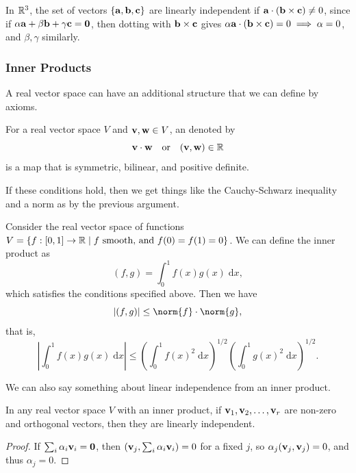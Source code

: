 \documentclass[a4paper]{scrartcl}
\begin{document}
In $\mathbb{R}^3$, the set of vectors $\{\mathbf{a}, \mathbf{b}, \mathbf{c}\}$ are linearly independent if $\mathbf{a} \cdot (\mathbf{b} \times \mathbf{c}) \neq 0$, since if $\alpha \mathbf{a} + \beta \mathbf{b} + \gamma \mathbf{c} = \mathbf{0}$, then dotting with $\mathbf{b} \times \mathbf{c}$ gives $\alpha \mathbf{a} \cdot (\mathbf{b} \times \mathbf{c}) = 0 \implies \alpha = 0$, and $\beta, \gamma$ similarly.


\subsubsection{Inner Products}

A real vector space can have an additional structure that we can define by axioms.

\begin{definition}
    For a real vector space $V$ and $\mathbf{v}, \mathbf{w} \in V$, an  denoted by
    $$
    \mathbf{v} \cdot \mathbf{w} \quad \text{or} \quad (\mathbf{v}, \mathbf{w}) \in \mathbb{R}
    $$
    is a map that is symmetric, bilinear, and positive definite.
\end{definition}

If these conditions hold, then we get things like the Cauchy-Schwarz inequality and a norm as by the previous argument.

\begin{example}
    Consider the real vector space of functions $V = \{ f: [0, 1] \rightarrow \mathbb{R} \mid f \text{ smooth, and } f(0) = f(1) = 0 \}$.
    We can define the inner product as
    $$
    (f, g) = \int_0^1 f(x)g(x) \; \mathrm{d}x,
    $$
    which satisfies the conditions specified above. Then we have
    $$
    |(f, g)| \leq \norm{f} \cdot \norm{g},
    $$
    that is,
    $$
    \left| \int_0^1 f(x)g(x)\; \mathrm{d}x \right| \leq \left(\int_0^1 f(x)^2\; \mathrm{d}x\right)^{1/2} \left(\int_0^1 g(x)^2\; \mathrm{d}x\right)^{1/2}.
    $$
\end{example}

We can also say something about linear independence from an inner product.

\begin{lemma}
In any real vector space $V$ with an inner product, if $\mathbf{v}_1, \mathbf{v}_2, \dots, \mathbf{v}_r$ are non-zero and orthogonal vectors, then they are linearly independent.
\end{lemma}
\begin{proof}
    If $\sum_i \alpha_i \mathbf{v}_i = \mathbf{0}$, then $(\mathbf{v}_j, \sum_i \alpha_i \mathbf{v}_i) = 0$ for a fixed $j$, so $\alpha_j (\mathbf{v}_j, \mathbf{v}_j) = 0$, and thus $\alpha_j = 0$.
\end{proof}
\end{document}
